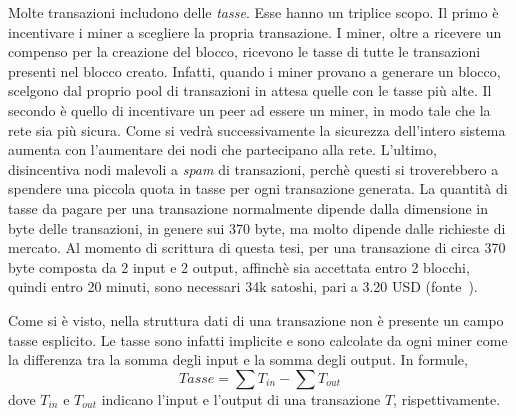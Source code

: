 Molte transazioni includono delle \emph{tasse}. Esse hanno un triplice scopo. Il primo è incentivare i miner a scegliere la propria transazione. I miner, oltre a ricevere un compenso per la creazione del blocco, ricevono le tasse di tutte le transazioni presenti nel blocco creato. Infatti, quando i miner provano a generare un blocco, scelgono dal proprio pool di transazioni in attesa quelle con le tasse più alte. Il secondo è quello di incentivare un peer ad essere un miner, in modo tale che la rete sia più sicura. Come si vedrà successivamente la sicurezza dell'intero sistema aumenta con l'aumentare dei nodi che partecipano alla rete. L'ultimo, disincentiva nodi malevoli a \emph{spam} di transazioni, perchè questi si troverebbero a spendere una piccola quota in tasse per ogni transazione generata. La quantità di tasse da pagare per una transazione normalmente dipende dalla dimensione in byte delle transazioni, in genere sui 370 byte, ma molto dipende dalle richieste di mercato. Al momento di scrittura di questa tesi, per una transazione di circa 370 byte composta da 2 input e 2 output, affinchè sia accettata entro 2 blocchi, quindi entro 20 minuti, sono necessari 34k satoshi, pari a 3.20 USD (fonte~\cite{bitcoin_fee_calculator}).

Come si è visto, nella struttura dati di una transazione non è presente un campo tasse esplicito. Le tasse sono infatti implicite e sono calcolate da ogni miner come la differenza tra la somma degli input e la somma degli output. In formule,
\begin{equation*}
	Tasse = \sum T_{in} - \sum T_{out}
\end{equation*}
dove $T_{in}$ e $T_{out}$ indicano l'input e l'output di una transazione $T$, rispettivamente.

